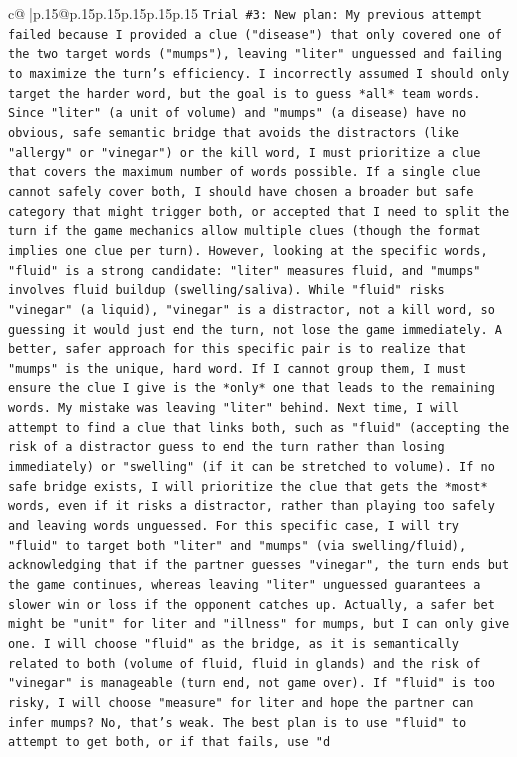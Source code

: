 \documentclass{article}
\begin{document}
{\begin{supertabular}{c@{$\;$}|p{.15\linewidth}@{}p{.15\linewidth}p{.15\linewidth}p{.15\linewidth}p{.15\linewidth}p{.15\linewidth}}
{{{\texttt{Trial \#3: New plan: My previous attempt failed because I provided a clue ("disease") that only covered one of the two target words ("mumps"), leaving "liter" unguessed and failing to maximize the turn's efficiency. I incorrectly assumed I should only target the harder word, but the goal is to guess *all* team words. Since "liter" (a unit of volume) and "mumps" (a disease) have no obvious, safe semantic bridge that avoids the distractors (like "allergy" or "vinegar") or the kill word, I must prioritize a clue that covers the maximum number of words possible. If a single clue cannot safely cover both, I should have chosen a broader but safe category that might trigger both, or accepted that I need to split the turn if the game mechanics allow multiple clues (though the format implies one clue per turn). However, looking at the specific words, "fluid" is a strong candidate: "liter" measures fluid, and "mumps" involves fluid buildup (swelling/saliva). While "fluid" risks "vinegar" (a liquid), "vinegar" is a distractor, not a kill word, so guessing it would just end the turn, not lose the game immediately. A better, safer approach for this specific pair is to realize that "mumps" is the unique, hard word. If I cannot group them, I must ensure the clue I give is the *only* one that leads to the remaining words. My mistake was leaving "liter" behind. Next time, I will attempt to find a clue that links both, such as "fluid" (accepting the risk of a distractor guess to end the turn rather than losing immediately) or "swelling" (if it can be stretched to volume). If no safe bridge exists, I will prioritize the clue that gets the *most* words, even if it risks a distractor, rather than playing too safely and leaving words unguessed. For this specific case, I will try "fluid" to target both "liter" and "mumps" (via swelling/fluid), acknowledging that if the partner guesses "vinegar", the turn ends but the game continues, whereas leaving "liter" unguessed guarantees a slower win or loss if the opponent catches up. Actually, a safer bet might be "unit" for liter and "illness" for mumps, but I can only give one. I will choose "fluid" as the bridge, as it is semantically related to both (volume of fluid, fluid in glands) and the risk of "vinegar" is manageable (turn end, not game over). If "fluid" is too risky, I will choose "measure" for liter and hope the partner can infer mumps? No, that's weak. The best plan is to use "fluid" to attempt to get both, or if that fails, use "d} \\
\\ 
}}}
\end{supertabular}}
\end{document}

